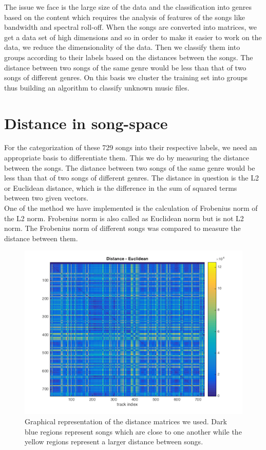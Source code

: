 \documentclass[12pt]{article}
\begin{document}
\begin{flushleft}
\vspace{0.5em}
The issue we face is the large size of the data and the classification into genres based on the content which requires the analysis of features of the songs like bandwidth and spectral roll-off. When the songs are converted into matrices, we get a data set of high dimensions and so in order to make it easier to work on the data, we reduce the dimensionality of the data. Then we classify them into groups according to their labels based on the distances between the songs. The distance between two songs of the same genre would be less than that of two songs of different genres. On this basis we cluster the training set into groups thus building an algorithm to classify unknown music files.
\end{flushleft}
\section{Distance in song-space}
\begin{flushleft}
For the categorization of these 729 songs into their respective labels, we need an appropriate basis to differentiate them. This we do by measuring the distance between the songs. The distance between two songs of the same genre would be less than that of two songs of different genres. The distance in question is the L2 or Euclidean distance, which is the difference in the sum of squared terms between two given vectors.\\
\vspace{0.5em}
One of the method we have implemented is the calculation of Frobenius norm of the L2 norm. Frobenius norm is also called as Euclidean norm but is not L2 norm. The Frobenius norm of different songs was compared to measure the distance between them.\\
\begin{figure}[!htb]
\includegraphics{distance.png}
\caption{Graphical representation of the distance matrices we used. Dark blue regions represent songs which are close to one another while the yellow regions represent a larger distance between songs.}
\end{figure}
\end{flushleft}
\end{document}
